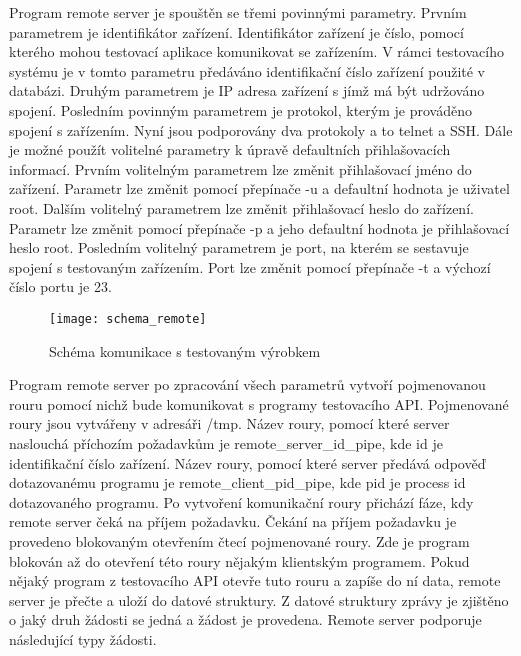 Program remote server je spouštěn se třemi povinnými parametry. Prvním parametrem je identifikátor zařízení. Identifikátor zařízení je číslo, pomocí kterého mohou testovací aplikace komunikovat se zařízením. V rámci testovacího systému je v tomto parametru předáváno identifikační číslo zařízení použité v databázi. Druhým parametrem je IP adresa zařízení s jímž má být udržováno spojení. Posledním povinným parametrem je protokol, kterým je prováděno spojení s zařízením. Nyní jsou podporovány dva protokoly a to telnet a SSH. Dále je možné použít volitelné parametry k úpravě defaultních přihlašovacích informací. Prvním volitelným parametrem lze změnit přihlašovací jméno do zařízení. Parametr lze změnit pomocí přepínače -u a defaultní hodnota je uživatel root. Dalším volitelný parametrem lze změnit přihlašovací heslo do zařízení. Parametr lze změnit pomocí přepínače -p a jeho defaultní hodnota je přihlašovací heslo root. Posledním volitelný parametrem je port, na kterém se sestavuje spojení s testovaným zařízením. Port lze změnit pomocí přepínače -t a výchozí číslo portu je 23.


\begin{figure}[h]
  \centering
  \texttt{[image: schema\_remote]}
  \caption{Schéma komunikace s testovaným výrobkem}
  \label{fig:schema_remote}
\end{figure}

Program remote server po zpracování všech parametrů vytvoří pojmenovanou rouru pomocí nichž bude komunikovat s programy testovacího API. Pojmenované roury jsou vytvářeny v adresáři /tmp. Název roury, pomocí které server naslouchá příchozím požadavkům je remote\_server\_id\_pipe, kde id je identifikační číslo zařízení. Název roury, pomocí které server předává odpověď dotazovanému programu je remote\_client\_pid\_pipe, kde pid je process id dotazovaného programu. Po vytvoření komunikační roury přichází fáze, kdy remote server čeká na příjem požadavku. Čekání na příjem požadavku je provedeno blokovaným otevřením čtecí pojmenované roury. Zde je program blokován až do otevření této roury nějakým klientským programem. Pokud nějaký program z testovacího API otevře tuto rouru a zapíše do ní data, remote server je přečte a uloží do datové struktury. Z datové struktury zprávy je zjištěno o jaký druh žádosti se jedná a žádost je provedena. Remote server podporuje následující typy žádosti.

